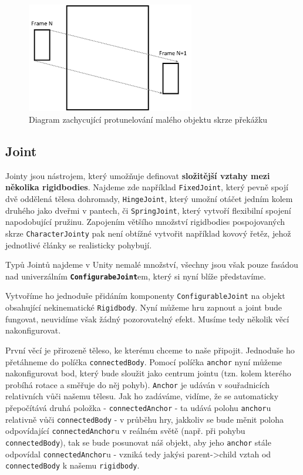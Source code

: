 \begin{figure}[ht]\centering
    \center
    \includegraphics[height=48mm]{../img/diagram-tunneling.png}
    \caption{Diagram zachycující protunelování malého objektu skrze překážku}
    \label{obr03:tunneling}
\end{figure} 

\subsection{Joint}

Jointy jsou nástrojem, který umožňuje definovat \textbf{složitější vztahy mezi několika rigidbodies}. Najdeme zde například \texttt{FixedJoint}, který pevně spojí dvě oddělená tělesa dohromady, \texttt{HingeJoint}, který umožní otáčet jedním kolem druhého jako dveřmi v pantech, či \texttt{SpringJoint}, který vytvoří flexibilní spojení napodobující pružinu. Zapojením většího množství rigidbodies pospojovaných skrze \texttt{CharacterJointy} pak není obtížné vytvořit například kovový řetěz, jehož jednotlivé články se realisticky pohybují.

Typů Jointů najdeme v Unity nemalé množství, všechny jsou však pouze fasádou nad univerzálním \textbf{\texttt{ConfigurabeJoint}}em, který si nyní blíže představíme.

Vytvoříme ho jednoduše přidáním komponenty \texttt{ConfigurableJoint} na objekt obsahující nekinematické \texttt{Rigidbody}. Nyní můžeme hru zapnout a joint bude fungovat, neuvidíme však žádný pozorovatelný efekt. Musíme tedy několik věcí nakonfigurovat.

První věcí je přirozeně těleso, ke kterému chceme to naše připojit. Jednoduše ho přetáhneme do políčka \texttt{connectedBody}. Pomocí políčka \texttt{anchor} nyní můžeme nakonfigurovat bod, který bude sloužit jako centrum jointu (tzn. kolem kterého probíhá rotace a směřuje do něj pohyb). \texttt{Anchor} je udáván v souřadnicích relativních vůči našemu tělesu. Jak ho zadáváme, vidíme, že se automaticky přepočítává druhá položka - \texttt{connectedAnchor} - ta udává polohu \texttt{anchor}u relativně vůči \texttt{connectedBody} - v průběhu hry, jakkoliv se bude měnit poloha odpovídající \texttt{connectedAnchor}u v reálném světě (např. při pohybu \texttt{connectedBody}), tak se bude posunovat náš objekt, aby jeho \texttt{anchor} stále odpovídal \texttt{connectedAnchor}u - vzniká tedy jakýsi parent->child vztah od \texttt{connectedBody} k našemu \texttt{rigidbody}. 

